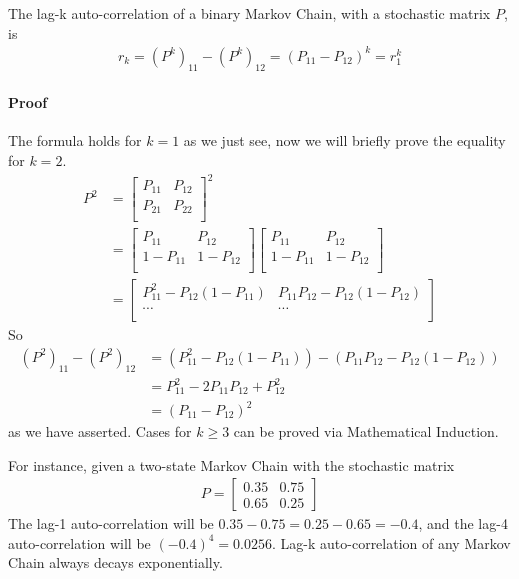 \begin{proper}
The lag-k auto-correlation of a binary Markov Chain, with a stochastic matrix $P$, is
\begin{align*}
r_k = (P^k)_{11} - (P^k)_{12} = (P_{11} - P_{12})^k = r_1^k
\end{align*}
\paragraph{Proof} The formula holds for $k=1$ as we just see, now we will briefly prove the equality for $k = 2$.
\begin{align*}
P^2 &=
\begin{bmatrix}
P_{11} & P_{12} \\
P_{21} & P_{22} \\
\end{bmatrix}^2 \\
&= 
\begin{bmatrix}
P_{11} & P_{12} \\
1-P_{11} & 1-P_{12} \\
\end{bmatrix}
\begin{bmatrix}
P_{11} & P_{12} \\
1-P_{11} & 1-P_{12} \\
\end{bmatrix} \\
&=
\begin{bmatrix}
P_{11}^2 - P_{12}(1-P_{11}) & P_{11}P_{12} - P_12(1-P_{12}) \\
\cdots & \cdots \\
\end{bmatrix}
\end{align*}
So
\begin{align*}
(P^2)_{11} - (P^2)_{12} &= (P_{11}^2 - P_{12}(1-P_{11})) -  (P_{11}P_{12} - P_12(1-P_{12})) \\
&= P_{11}^2 - 2P_{11}P_{12} + P_{12}^2 \\
&= (P_{11} - P_{12})^2
\end{align*}
as we have asserted. Cases for $k \geq 3$ can be proved via Mathematical Induction.
\end{proper}
For instance, given a two-state Markov Chain with the stochastic matrix
\begin{align*}
P = 
\begin{bmatrix}
0.35 & 0.75 \\
0.65 & 0.25
\end{bmatrix}
\end{align*}
The lag-1 auto-correlation will be $0.35 - 0.75 = 0.25 - 0.65 = -0.4$, and the lag-4 auto-correlation will be $(-0.4)^4 = 0.0256$. Lag-k auto-correlation of any Markov Chain always decays exponentially.

